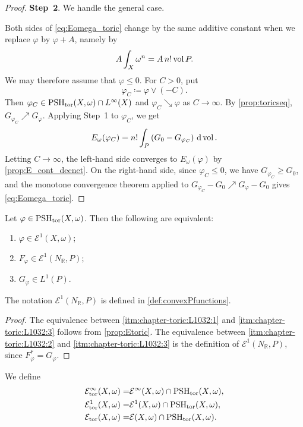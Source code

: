 \begin{proof}
    \textbf{Step~2}. We handle the general case.

    Both sides of \eqref{eq:Eomega_toric} change by the same additive constant when we replace $\varphi$ by $\varphi+A$, namely by
    \[
        A\int_X\omega^n=A\,n!\operatorname{vol} P.
    \]
    We may therefore assume that $\varphi\leq 0$. For $C>0$, put
    \[
        \varphi_C\coloneqq \varphi\lor(-C).
    \]
    Then $\varphi_C\in \mathrm{PSH}_{\mathrm{tor}}(X,\omega)\cap L^{\infty}(X)$ and $\varphi_C\searrow \varphi$ as $C\to\infty$. By \cref{prop:toricseq}, $G_{\varphi_C}\nearrow G_{\varphi}$. Applying Step~1 to $\varphi_C$, we get
    \[
        E_{\omega}(\varphi_C)=n!\int_P \left(G_0-G_{\varphi_C}\right)\,\mathrm{d}\operatorname{vol}.
    \]
    Letting $C\to\infty$, the left-hand side converges to $E_{\omega}(\varphi)$ by \cref{prop:E_cont_decnet}. On the right-hand side, since $\varphi_C\leq 0$, we have $G_{\varphi_C}\geq G_0$, and the monotone convergence theorem applied to $G_{\varphi_C}-G_0\nearrow G_{\varphi}-G_0$ gives \eqref{eq:Eomega_toric}.
\end{proof}

\begin{corollary}\label{cor:toric-ample:L1092}
    Let $\varphi\in \mathrm{PSH}_{\mathrm{tor}}(X,\omega)$. Then the following are equivalent:
    \begin{enumerate}
        \item\label{itm:chapter-toric:L1032:1} $\varphi\in \mathcal{E}^1(X,\omega)$;
        \item\label{itm:chapter-toric:L1032:2} $F_{\varphi}\in \mathcal{E}^1(N_{\mathbb{R}},P)$;
        \item\label{itm:chapter-toric:L1032:3} $G_{\varphi}\in L^1(P)$.
    \end{enumerate}
\end{corollary}
The notation $\mathcal{E}^1(N_{\mathbb{R}},P)$ is defined in \cref{def:convexPfunctions}.
\begin{proof}
    The equivalence between \ref{itm:chapter-toric:L1032:1} and \ref{itm:chapter-toric:L1032:3} follows from \cref{prop:Etoric}. The equivalence between \ref{itm:chapter-toric:L1032:2} and \ref{itm:chapter-toric:L1032:3} is the definition of $\mathcal{E}^1(N_{\mathbb{R}},P)$, since $F_{\varphi}^*=G_{\varphi}$.
\end{proof}
\begin{definition}\label{def:toric-ample:L1104}
    We define
    \[
        \begin{aligned}
        \mathcal{E}^{\infty}_{\mathrm{tor}}(X,\omega)= & \mathcal{E}^{\infty}(X,\omega) \cap \mathrm{PSH}_{\mathrm{tor}}(X,\omega),\\
        \mathcal{E}^{1}_{\mathrm{tor}}(X,\omega)= & \mathcal{E}^{1}(X,\omega) \cap \mathrm{PSH}_{\mathrm{tor}}(X,\omega),\\
        \mathcal{E}_{\mathrm{tor}}(X,\omega)= & \mathcal{E}(X,\omega) \cap \mathrm{PSH}_{\mathrm{tor}}(X,\omega).
        \end{aligned}
    \]
\end{definition}


